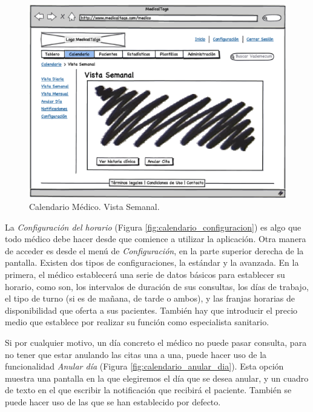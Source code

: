 \documentclass[a4paper,oneside,11pt]{book}
\begin{document}
			
			\begin{figure}[H]
			  \centering
			    \includegraphics[width=12cm]{img/eps/13_Calendario_Medico.eps}
			  \caption{Calendario Médico. Vista Semanal.}
			  \label{fig:calendario_vista_semanal}
			\end{figure}
			
			La \textit{Configuración del horario} (Figura \ref{fig:calendario_configuracion}) es algo que todo médico debe hacer desde que comience a utilizar la aplicación. Otra manera de acceder es desde el menú de \textit{Configuración}, en la parte superior derecha de la pantalla. 
			Existen dos tipos de configuraciones, la estándar y la avanzada. En la primera, el médico establecerá una serie de datos básicos para establecer su horario, como son, los intervalos de duración de sus consultas, los días de trabajo, el tipo de turno (si es de mañana, de tarde o ambos), y las franjas horarias de disponibilidad que oferta a sus pacientes. También hay que introducir el precio medio que establece por realizar su función como especialista sanitario.
			
				
				Si por cualquier motivo, un día concreto el médico no puede pasar consulta, para no tener que estar anulando las citas una a una, puede hacer uso de la funcionalidad \textit{Anular día} (Figura \ref{fig:calendario_anular_dia}). Esta opción muestra una pantalla en la que elegiremos el día que se desea anular, y un cuadro de texto en el que escribir la notificación que recibirá el paciente. También se puede hacer uso de las que se han establecido por defecto.
				
\end{document}
